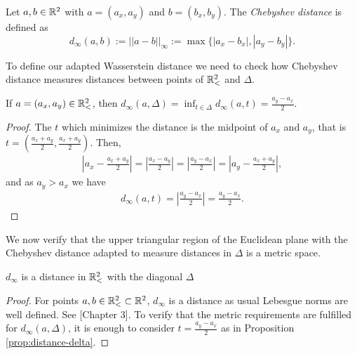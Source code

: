 \begin{definition}
    Let $ a, b \in \mathbb R^2 $ with $a = (a_x, a_y) $ and $ b = (b_x, b_y) $. The {\it Chebyshev distance} is defined as
    $$
        d_\infty(a, b) := ||a-b||_{\infty} := \max \{|a_x - b_x|, |a_y - b_y|\}.
    $$
\end{definition}

To define our adapted Wasserstein distance we need to check how Chebyshev distance measures distances between points of $ \mathbb{R}_<^2 $ and $ \Delta $.

\begin{proposition} \label{prop:distance-delta}
    If $ a = (a_x, a_y) \in \mathbb{R}_<^2 $, then $ d_\infty(a, \Delta) = \inf_{t \in \Delta} d_\infty(a, t) = \frac{a_y - a_x}{2} $.
\end{proposition}
\begin{proof}
    The $ t $ which minimizes the distance is the midpoint of $ a_x $ and $ a_y $, that is $t = \left(\frac{a_x+a_y}{2}, \frac{a_x+a_y}{2}\right)  $. Then,
    \begin{align*}
        \left| a_x - \frac{a_x+a_y}{2} \right| = \left| \frac{a_x-a_y}{2}\right| = \left| \frac{a_y-a_x}{2}\right| = \left| a_y - \frac{a_x+a_y}{2} \right|,
    \end{align*}
    and as $ a_y > a_x $ we have
    \begin{align*}
        d_\infty(a, t) = \left|\frac{a_y - a_x}{2}\right| = \frac{a_y - a_x}{2}.
    \end{align*}
\end{proof}

We now verify that the upper triangular region of the Euclidean plane with the Chebyshev distance adapted to measure distances in $ \Delta $ is a metric space.
\begin{proposition}
    $ d_\infty $ is a distance in $ \mathbb{R}_<^2 $ with the diagonal $ \Delta $
\end{proposition}
\begin{proof}
    For points $ a, b \in \mathbb{R}_<^2 \subset \mathbb R^2 $, $ d_\infty $ is a distance as usual Lebesgue norms are well defined. See \cite{rudin}[Chapter 3]. To verify that the metric requirements are fulfilled for $ d_\infty(a, \Delta) $, it is enough to consider $ t = \frac{a_y - a_x}{2} $ as in Proposition \ref{prop:distance-delta}.
\end{proof}

